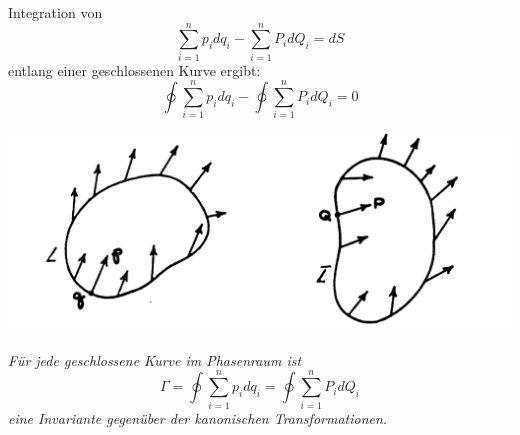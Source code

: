 \begin{frame}
    Integration von
    \begin{displaymath}
    \sum_{i=1}^{n} p_i d q_i - \sum_{i=1}^{n} P_i d Q_i = d S
    \end{displaymath}
    entlang einer geschlossenen Kurve ergibt:
   \begin{displaymath}
   \oint \sum_{i=1}^{n} p_i d q_i - \oint \sum_{i=1}^{n} P_i d Q_i = 0
   \end{displaymath}
    \begin{center} \includegraphics[scale=0.225]{images/circulation}  \end{center}  

\end{frame}

\begin{frame}
     \emph{Für jede geschlossene Kurve im Phasenraum ist}
    \begin{displaymath}
    \Gamma = \oint \sum_{i=1}^{n} p_i d q_i = \oint \sum_{i=1}^{n} P_i d Q_i
    \end{displaymath}
     \emph{eine Invariante gegenüber der kanonischen Transformationen.}
 
\end{frame}